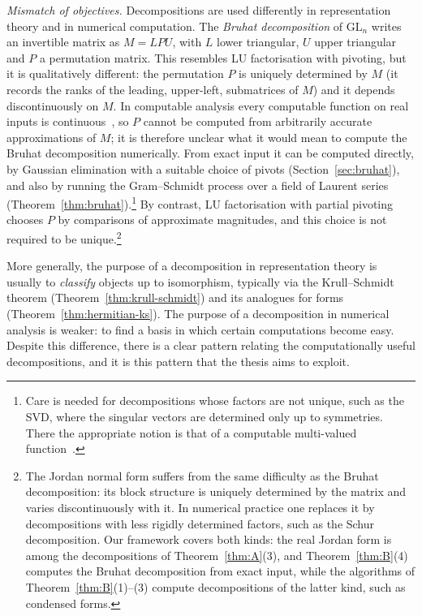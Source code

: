 \documentclass[12pt, a4paper]{report}
\theoremstyle{plain}
\theoremstyle{definition}
\theoremstyle{remark}
\theoremstyle{plain}
\newcommand{\GL}{\mathrm{GL}}
\begin{document}
\emph{Mismatch of objectives.} Decompositions are used differently in representation theory and in numerical computation. The \emph{Bruhat decomposition} of $\GL_n$ writes an invertible matrix as $M=LPU$, with $L$ lower triangular, $U$ upper triangular and $P$ a permutation matrix. This resembles LU factorisation with pivoting, but it is qualitatively different: the permutation $P$ is uniquely determined by $M$ (it records the ranks of the leading, upper-left, submatrices of $M$) and it depends discontinuously on $M$. In computable analysis every computable function on real inputs is continuous~\cite{Weihrauch2000}, so $P$ cannot be computed from arbitrarily accurate approximations of $M$; it is therefore unclear what it would mean to compute the Bruhat decomposition numerically. From exact input it can be computed directly, by Gaussian elimination with a suitable choice of pivots (Section~\ref{sec:bruhat}), and also by running the Gram--Schmidt process over a field of Laurent series (Theorem~\ref{thm:bruhat}).\footnote{Care is needed for decompositions whose factors are not unique, such as the SVD, where the singular vectors are determined only up to symmetries. There the appropriate notion is that of a computable multi-valued function~\cite{Weihrauch2000}.} By contrast, LU factorisation with partial pivoting chooses $P$ by comparisons of approximate magnitudes, and this choice is not required to be unique.\footnote{The Jordan normal form suffers from the same difficulty as the Bruhat decomposition: its block structure is uniquely determined by the matrix and varies discontinuously with it. In numerical practice one replaces it by decompositions with less rigidly determined factors, such as the Schur decomposition. Our framework covers both kinds: the real Jordan form is among the decompositions of Theorem~\ref{thm:A}(3), and Theorem~\ref{thm:B}(4) computes the Bruhat decomposition from exact input, while the algorithms of Theorem~\ref{thm:B}(1)--(3) compute decompositions of the latter kind, such as condensed forms.}

More generally, the purpose of a decomposition in representation theory is usually to \emph{classify} objects up to isomorphism, typically via the Krull--Schmidt theorem (Theorem~\ref{thm:krull-schmidt}) and its analogues for forms (Theorem~\ref{thm:hermitian-ks}). The purpose of a decomposition in numerical analysis is weaker: to find a basis in which certain computations become easy. Despite this difference, there is a clear pattern relating the computationally useful decompositions, and it is this pattern that the thesis aims to exploit.
\end{document}
